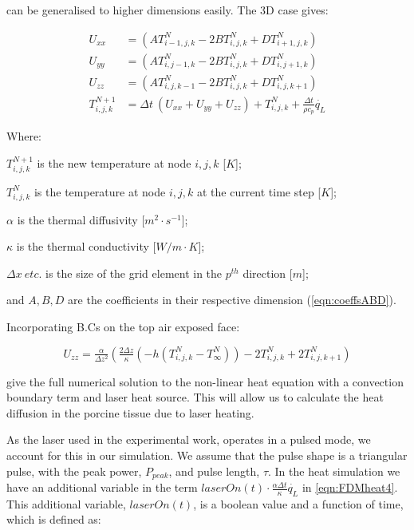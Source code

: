  can be generalised to higher dimensions easily. The 3D case gives:

\begin{align}
U_{xx} &=  (A T^N_{i-1,j,k} - 2B T^N_{i,j,k} + D T^N_{i+1,j,k}) \label{eqn:FDMheat1}\\
U_{yy} &=  (A T^N_{i,j-1,k} - 2B T^N_{i,j,k} + D T^N_{i,j+1,k}) \label{eqn:FDMheat2}\\
U_{zz} &=  (A T^N_{i,j,k-1} - 2B T^N_{i,j,k} + D T^N_{i,j,k+1}) \label{eqn:FDMheat3}\\
T^{N+1}_{i,j,k} &= \Delta t\ (U_{xx} + U_{yy} + U_{zz}) + T^{N}_{i,j,k} + \tfrac{\Delta t}{\rho c_p}\dot{q_L} \label{eqn:FDMheat4}
\end{align}

\noindent Where:

	\indent $T^{N+1}_{i,j,k}$ is the new temperature at node $i,j,k$ [$K$];
	
	\indent $T^N_{i,j,k}$ is the temperature at node $i,j,k$ at the current time step [$K$];
	
	\indent $\alpha$ is the thermal diffusivity [$m^2\cdot s^{-1}$];
	
	\indent $\kappa$ is the thermal conductivity [$W/m\cdot K$];
	
	\indent $\Delta x\ etc.$ is the size of the grid element in the $p^{th}$ direction [$m$];
	
	\indent and $A, B,D$ are the coefficients in their respective dimension (\cref{eqn:coeffsABD}).

	\medskip
	
Incorporating B.Cs on the top air exposed face:

\begin{equation}
U_{zz} = \tfrac{\alpha}{\Delta z^2} (\tfrac{2 \Delta z}{\kappa} (-h(T^N_{i,j,k}-T^N_\infty) ) -2 T^N_{i,j,k} + 2T^N_{i,j,k+1})\label{eqn:bceqn} 
\end{equation}

 give the full numerical solution to the non-linear heat equation with a convection boundary term and laser heat source. This will allow us to calculate the heat diffusion in the porcine tissue due to laser heating.

\medskip

As the laser used in the experimental work, operates in a pulsed mode, we account for this in our simulation. We assume that the pulse shape is a triangular pulse, with the peak power, $P_{peak}$, and pulse length, $\tau$. In the heat simulation we have an additional variable in the term $laserOn(t)\cdot\tfrac{\alpha \Delta t}{\kappa}\dot{q_L}$ in \cref{eqn:FDMheat4}. This additional variable, $laserOn(t)$, is a boolean value and a function of time, which is defined as:

